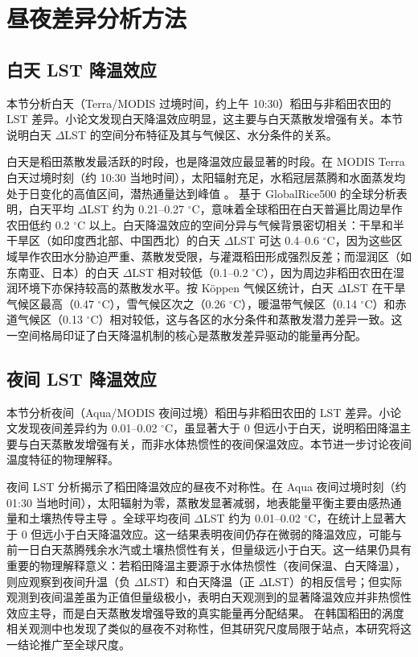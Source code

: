 \section{昼夜差异分析方法}

\subsection{白天 LST 降温效应}

本节分析白天（Terra/MODIS 过境时间，约上午 10:30）稻田与非稻田农田的 LST 差异。小论文发现白天降温效应明显，这主要与白天蒸散发增强有关。本节说明白天 $\Delta$LST 的空间分布特征及其与气候区、水分条件的关系。

白天是稻田蒸散发最活跃的时段，也是降温效应最显著的时段。在 MODIS Terra 白天过境时刻（约 10:30 当地时间），太阳辐射充足，水稻冠层蒸腾和水面蒸发均处于日变化的高值区间，潜热通量达到峰值 \cite{Xue2021RemoteSensing}。\cite{Weng2025} 基于 GlobalRice500 的全球分析表明，白天平均 $\Delta$LST 约为 0.21--0.27 $^{\circ}\mathrm{C}$，意味着全球稻田在白天普遍比周边旱作农田低约 0.2 $^{\circ}\mathrm{C}$ 以上。白天降温效应的空间分异与气候背景密切相关：干旱和半干旱区（如印度西北部、中国西北）的白天 $\Delta$LST 可达 0.4--0.6 $^{\circ}\mathrm{C}$，因为这些区域旱作农田水分胁迫严重、蒸散发受限，与灌溉稻田形成强烈反差；而湿润区（如东南亚、日本）的白天 $\Delta$LST 相对较低（0.1--0.2 $^{\circ}\mathrm{C}$），因为周边非稻田农田在湿润环境下亦保持较高的蒸散发水平。按 Köppen 气候区统计，白天 $\Delta$LST 在干旱气候区最高（0.47 $^{\circ}\mathrm{C}$），雪气候区次之（0.26 $^{\circ}\mathrm{C}$），暖温带气候区（0.14 $^{\circ}\mathrm{C}$）和赤道气候区（0.13 $^{\circ}\mathrm{C}$）相对较低，这与各区的水分条件和蒸散发潜力差异一致。这一空间格局印证了白天降温机制的核心是蒸散发差异驱动的能量再分配。

\subsection{夜间 LST 降温效应}

本节分析夜间（Aqua/MODIS 夜间过境）稻田与非稻田农田的 LST 差异。小论文发现夜间差异约为 0.01--0.02 $^{\circ}\mathrm{C}$，虽显著大于 0 但远小于白天，说明稻田降温主要与白天蒸散发增强有关，而非水体热惯性的夜间保温效应。本节进一步讨论夜间温度特征的物理解释。

夜间 LST 分析揭示了稻田降温效应的昼夜不对称性。在 Aqua 夜间过境时刻（约 01:30 当地时间），太阳辐射为零，蒸散发显著减弱，地表能量平衡主要由感热通量和土壤热传导主导 \cite{Weng2025}。全球平均夜间 $\Delta$LST 约为 0.01--0.02 $^{\circ}\mathrm{C}$，在统计上显著大于 0 但远小于白天降温效应。这一结果表明夜间仍存在微弱的降温效应，可能与前一日白天蒸腾残余水汽或土壤热惯性有关，但量级远小于白天。这一结果仍具有重要的物理解释意义：若稻田降温主要源于水体热惯性（夜间保温、白天降温），则应观察到夜间升温（负 $\Delta$LST）和白天降温（正 $\Delta$LST）的相反信号；但实际观测到夜间温差虽为正值但量级极小，表明白天观测到的显著降温效应并非热惯性效应主导，而是白天蒸散发增强导致的真实能量再分配结果。\cite{Xue2021RemoteSensing} 在韩国稻田的涡度相关观测中也发现了类似的昼夜不对称性，但其研究尺度局限于站点，本研究将这一结论推广至全球尺度。

